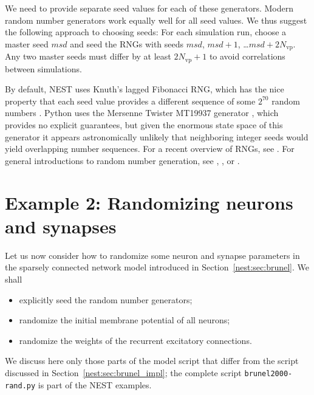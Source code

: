 \documentclass{article}
\newcommand{\Nvp}{N_{\text{vp}}}
\begin{document}
We need to provide separate seed values for each of these generators.
Modern random number generators work equally well for all seed
values. We thus suggest the following approach to choosing seeds: For
each simulation run, choose a {master seed} $msd$ and seed the RNGs
with seeds $msd$, $msd+1$, \dots $msd+2\Nvp$. Any two master seeds must
differ by at least $2\Nvp+1$ to avoid correlations between simulations.

By default, NEST uses Knuth's lagged Fibonacci RNG, which has the nice
property that each seed value provides a different sequence of
some $2^{70}$ random numbers \citep[Ch.~3.6]{Knut:Art(2)(1998)}. Python
uses the Mersenne Twister MT19937 generator \citep{Mats:1998(3)},
which provides no explicit guarantees, but given the enormous state
space of this generator it appears astronomically unlikely that
neighboring integer seeds would yield overlapping number
sequences. For a recent overview of RNGs, see
\cite{Lecu:2007(22)}. For general introductions to random number
generation, see \citet{Gent:Rand(2003)},
\citet[Ch.~3]{Knut:Art(2)(1998)}, or \citet{Ples:2010(399)}.

\section{Example 2: Randomizing neurons and synapses}\label{nest:sec:rand_example}

\renewcommand*\thelstnumber{r\arabic{lstnumber}}

Let us now consider how to randomize some neuron and synapse
parameters in the sparsely connected network model introduced in
Section~\ref{nest:sec:brunel}. We shall 
\begin{itemize}
\item explicitly seed the random number generators;
\item randomize the initial membrane potential of all neurons;
\item randomize the weights of the recurrent excitatory connections.
\end{itemize}
We discuss here only those parts of the model script that differ from
the script discussed in Section~\ref{nest:sec:brunel_impl}; the complete
script \lstinline!brunel2000-rand.py! is part of the NEST examples. 
\end{document}
